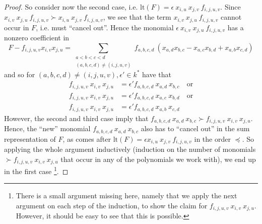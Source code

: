 \documentclass{scrartcl}
\theoremstyle{definition}
\begin{document}
\begin{proof}
    So consider now the second case, i.e. $\mathrm{lt}(F) = \epsilon \ x_{i, u} \ x_{j, v} \ f_{i, j, u, v}$.
    Since $x_{i, v} \ x_{j, u} \ f_{i, j, u, v} \succ x_{i, u} \ x_{j, v} \ f_{i, j, u, v}$, we see that the term $x_{i, v} \ x_{j, u} \ f_{i, j, u, v}$ cannot occur in $F$, i.e. must ``cancel out''.
    Hence the monomial $\epsilon \ x_{i, v} \ x_{j, u} \ f_{i, j, u, v}$ has a nonzero coefficient in
    \begin{equation*}
        F - f_{i, j, u, v} x_{i, v} x_{j, u} = \sum_{\substack{a < b < c < d\\(a, b, c, d) \neq (i, j, u, v)}} f_{a, b, c, d} \ (x_{a, d} x_{b, c} - x_{a, c} x_{b, d} + x_{a, b} x_{c, d})
    \end{equation*}
    and so for $(a, b, c, d) \neq (i, j, u, v), \epsilon' \in k^*$ have that
    \begin{align*}
        f_{i, j, u, v} \ x_{i, v} \ x_{j, u} &= \epsilon' f_{a, b, c, d} \ x_{a, d} \ x_{b, c} \quad \text{or}\\
        f_{i, j, u, v} \ x_{i, v} \ x_{j, u} &= \epsilon' f_{a, b, c, d} \ x_{a, c} \ x_{b, d} \quad \text{or}\\
        f_{i, j, u, v} \ x_{i, v} \ x_{j, u} &= \epsilon' f_{a, b, c, d} \ x_{a, b} \ x_{c, d}
    \end{align*}
    However, the second and third case imply that $f_{a, b, c, d} \ x_{a, d} \ x_{b, c} \succ f_{i, j, u, v} \ x_{i, v} \ x_{j, u}$.
    Hence, the ``new'' monomial $f_{a, b, c, d} \ x_{a, d} \ x_{b, c}$ also has to ``cancel out'' in the sum representation of $F$, as comes after $\mathrm{lt}(F) = \epsilon x_{i, u} \ x_{j, v} \ f_{i, j, u, v}$ in the order $\preceq$.
    So applying the whole argument inductively (induction on the number of monomials $\succ f_{i, j, u, v} \ x_{i, v} \ x_{j, u}$ that occur in any of the polynomials we work with), we end up in the first case
    \footnote{There is a small argument missing here, namely that we apply the next argument on each step of the induction, to show the claim for $f_{i, j, u, v} \ x_{i, v} \ x_{j, u}$. However, it should be easy to see that this is possible.}.


\end{proof}
\end{document}
